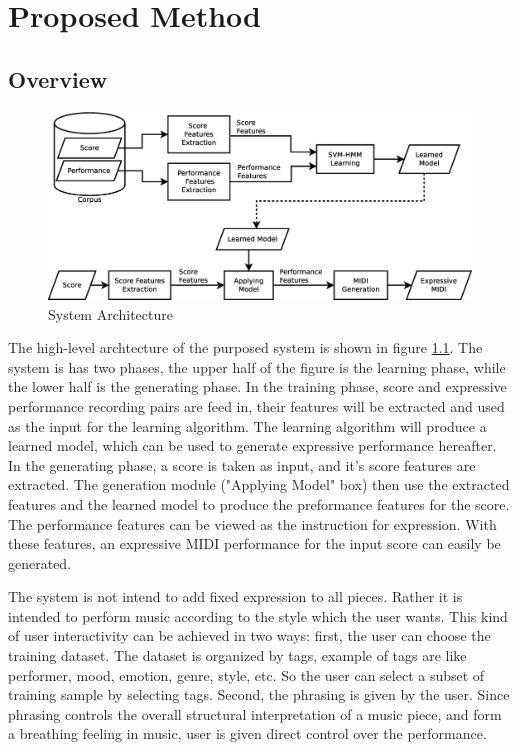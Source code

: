 \chapter{Proposed Method}
\section{Overview}
      \begin{figure}[tp]
         \begin{center}
            \includegraphics[width=\textwidth]{fig/sys_arch}
         \end{center}
         \caption{System Architecture} 
         \label{fig:flow}
      \end{figure}
The high-level archtecture of the purposed system is shown in figure \ref{fig:flow}. The system is has two phases, the upper half of the figure is the learning phase, while the lower half is the generating phase.  In the training phase, score and expressive performance recording pairs are feed in, their features will be extracted and used as the input for the learning algorithm.  The learning algorithm will produce a learned model, which can be used to generate expressive performance hereafter. In the generating phase, a score is taken as input, and it's score features are extracted. The generation module ("Applying Model" box) then use the extracted features and the learned model to produce the preformance features for the score. The performance features can be viewed as the instruction for expression. With these features, an expressive MIDI performance for the input score can easily be generated.  

The system is not intend to add fixed expression to all pieces. Rather it is intended to perform music according to the style which the user wants. This kind of user interactivity can be achieved in two ways: first, the user can choose the training dataset. The dataset is organized by tags, example of tags are like performer, mood, emotion, genre, style, etc. So the user can select a subset of training sample by selecting tags. Second, the phrasing is given by the user. Since phrasing controls the overall structural interpretation of a music piece, and form a breathing feeling in music, user is given direct control over the performance.

